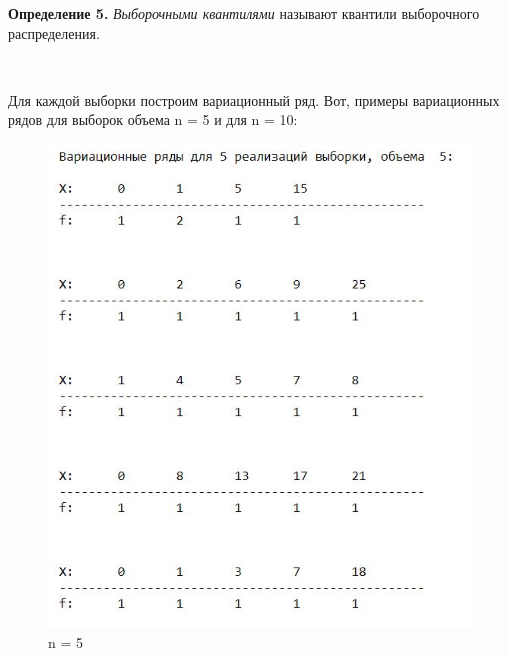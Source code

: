\documentclass[a4paper,12pt, oneside]{book}
\begin{document}
\normalsize{\textbf{Определение 5.}} \textit{Выборочными квантилями } называют квантили выборочного распределения.

\vspace{5mm}
\\
\vspace{5mm}



Для каждой выборки построим вариационный ряд. Вот, примеры вариационных рядов для выборок объема n = 5 и для n = 10:

\begin{figure}[h!]
	\begin{center}
		\begin{minipage}[h]{0.4\linewidth}
			\includegraphics[width=1\linewidth]{var_ser_5.jpg}
			\caption{n = 5} %
		\end{minipage}
		\hfill
		\begin{minipage}[h]{0.4\linewidth}

\end{minipage}
\end{center}
\end{figure}
\end{document}
